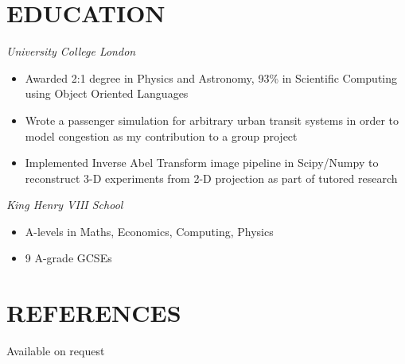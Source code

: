 \documentclass[margin, 10pt]{res}
\begin{document}
\begin{resume}
\section{EDUCATION}

{\sl University College London} \\
\begin{itemize} \itemsep -1pt
\item Awarded 2:1 degree in Physics and Astronomy, 93\% in Scientific Computing using Object Oriented Languages
\item Wrote a passenger simulation for arbitrary urban transit systems in order to model congestion as my contribution to a group project
\item Implemented Inverse Abel Transform image pipeline in Scipy/Numpy to reconstruct 3-D experiments from 2-D projection as part of tutored research
\end{itemize}

{\sl King Henry VIII School} \\
\begin{itemize}
\item A-levels in Maths, Economics, Computing, Physics
\item 9 A-grade GCSEs
\end{itemize}

\section{REFERENCES}
Available on request

\end{resume}
\end{document}
